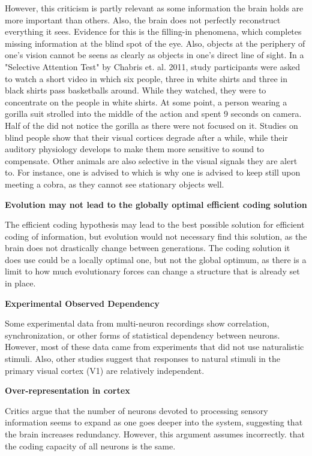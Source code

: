 \documentclass[twoside]{article}
\begin{document}
\begin{multicols}{2}
However, this criticism is partly relevant as some information the brain holds are more important than others. Also, the brain does not perfectly reconstruct everything it sees. Evidence for this is the filling-in phenomena, which completes missing information at the blind spot of the eye. Also, objects at the periphery of one's vision cannot be seens as clearly as objects in one's direct line of sight. In a "Selective Attention Test" by Chabris et. al. 2011, study participants were asked to watch a short video in which six people, three in white shirts and three in black shirts pass basketballs around. While they watched, they were to concentrate on the people in white shirts. At some point, a person wearing a  gorilla suit strolled into the middle of the action and spent 9 seconds on camera. Half of the did not notice the gorilla as there were not focused on it. Studies on blind people show that their visual cortices degrade after a while, while their auditory physiology develops to make them more sensitive to sound to compensate. Other animals are also selective in the visual signals they are alert to. For instance, one is advised to which is why one is advised to keep still upon meeting a cobra, as they cannot see stationary objects well. 

\noindent\textbf{Evolution may not lead to the globally optimal efficient coding solution}

The efficient coding hypothesis may lead to the best possible solution for efficient coding of information, but evolution would not necessary find this solution, as the brain does not drastically change between generations. The coding solution it does use could be a locally optimal one, but not the global optimum, as there is a limit to how much evolutionary forces can change a structure that is already set in place. 

\noindent\textbf{Experimental Observed Dependency}

Some experimental data from multi-neuron recordings show correlation, synchronization, or other forms of statistical dependency between neurons. However, most of these data came from experiments that did not use naturalistic stimuli. Also, other studies suggest that responses to natural stimuli in the primary visual cortex (V1) are relatively independent. 

\noindent\textbf{Over-representation in cortex}

Critics argue that the number of neurons devoted to processing sensory information seems to expand as one goes deeper into the system, suggesting that the brain increases redundancy. However, this argument assumes incorrectly. that the coding capacity of all neurons is the same. 


\end{multicols}
\end{document}
